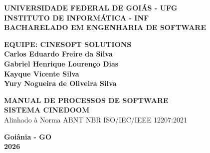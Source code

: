 \documentclass[12pt,a4paper]{article}
\begin{document}
\begin{titlepage}
  \centering
  \MakeUppercase{\textbf{Universidade Federal de Goiás - UFG}}\\
  \MakeUppercase{\textbf{Instituto de Informática - INF}}\\
  \MakeUppercase{\textbf{Bacharelado em Engenharia de Software}}\\
  \vspace{3.2cm}
  
  \textbf{EQUIPE: CINESOFT SOLUTIONS}\\
  \vspace{0.6cm}
  \textbf{Carlos Eduardo Freire da Silva}\\
  \textbf{Gabriel Henrique Lourenço Dias}\\
  \textbf{Kayque Vicente Silva}\\
  \textbf{Yury Nogueira de Oliveira Silva}\\
  \vspace{3.2cm}
  
  \MakeUppercase{\textbf{Manual de Processos de Software}}\\
  \MakeUppercase{\textbf{Sistema CineDoom}}\\
  \vspace{0.8cm}
  \large Alinhado à Norma ABNT NBR ISO/IEC/IEEE 12207:2021\\
  \vfill
  
  \textbf{Goiânia - GO}\\
  \textbf{2026}
\end{titlepage}
\end{document}
